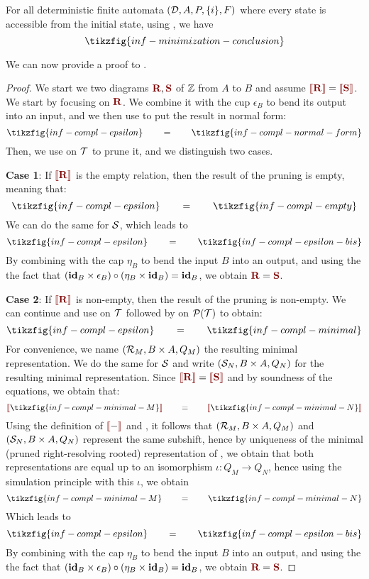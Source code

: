 \begin{corollary}\label{appcor:minimization-inf}
	For all deterministic finite automata $(\D,A,P,\{i\},F)$ where every state is accessible from the initial state, using , we have
	\[ \tikzfig{inf-minimization-conclusion}\]
\end{corollary}
We can now provide a proof to .
\begin{proof}
	We start we two diagrams $\rR,\rS$ of $\ZZ$ from $A$ to $B$ and assume $\rinterp{\rR} = \rinterp{\rS}$. We start by focusing on $\rR$. We combine it with the cup $\epsilon_B$ to bend its output into an input, and we then use  to put the result in normal form:
	\[ \tikzfig{inf-compl-epsilon} \qquad = \qquad \tikzfig{inf-compl-normal-form}\]
	Then, we use  on $\T$ to prune it, and we distinguish two cases.
	
	\textbf{Case 1}: If $\rinterp{\rR}$ is the empty relation, then the result of the pruning is empty, meaning that:
	\[ \tikzfig{inf-compl-epsilon} \qquad = \qquad \tikzfig{inf-compl-empty} \]
	We can do the same for $\S$, which leads to
	\[\tikzfig{inf-compl-epsilon} \qquad = \qquad \tikzfig{inf-compl-epsilon-bis}   \]
	By combining with the cap $\eta_B$ to bend the input $B$ into an output, and using the the fact that $(\id_B \times \epsilon_B) \circ (\eta_B \times \id_B) = \id_B$, we obtain $\rR = \rS$.
	
	\textbf{Case 2}: If $\rinterp{\rR}$ is non-empty, then the result of the pruning is non-empty. We can continue and use  on $\T$ followed by  on $\P(\T)$ to obtain:
	\[ \tikzfig{inf-compl-epsilon} \qquad = \qquad \tikzfig{inf-compl-minimal}\]
	For convenience, we name $(\R_M,B \times A,Q_M)$ the resulting minimal representation. We do the same for $\S$ and write $(\S_N,B \times A,Q_N)$ for the resulting minimal representation. Since $\rinterp{\rR} = \rinterp{\rS}$ and by soundness of the equations, we obtain that:
	\[ \rinterp{\tikzfig{inf-compl-minimal-M}} \qquad = \qquad \rinterp{\tikzfig{inf-compl-minimal-N}} \]
	Using the definition of $\rinterp{-}$ and , it follows that $(\R_M,B \times A,Q_M)$ and $(\S_N,B \times A,Q_N)$ represent the same subshift, hence by uniqueness of the minimal (pruned right-resolving rooted) representation of , we obtain that both representations are equal up to an isomorphism $\iota : Q_M \to Q_N$, hence using the simulation principle with this $\iota$, we obtain
	\[  \tikzfig{inf-compl-minimal-M} \qquad =\qquad \tikzfig{inf-compl-minimal-N} \]
	Which leads to
	\[\tikzfig{inf-compl-epsilon} \qquad = \qquad \tikzfig{inf-compl-epsilon-bis}   \]
	By combining with the cap $\eta_B$ to bend the input $B$ into an output, and using the the fact that $(\id_B \times \epsilon_B) \circ (\eta_B \times \id_B) = \id_B$, we obtain $\rR = \rS$.
\end{proof}
